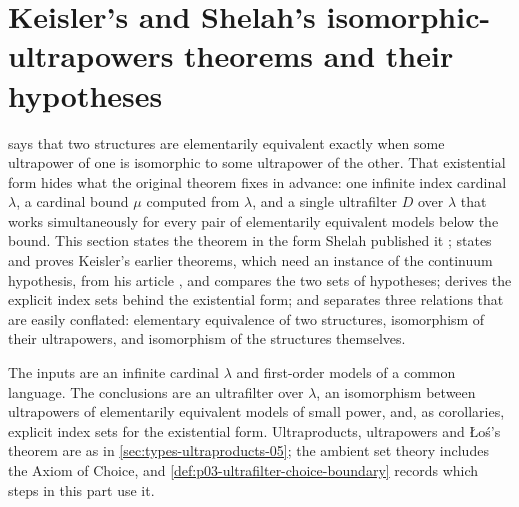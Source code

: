 \section{Keisler's and Shelah's isomorphic-ultrapowers theorems and their hypotheses}
\label{sec:p03-w03-p03-018-shelah-ultrapowers}

 says that two structures are elementarily
equivalent exactly when some ultrapower of one is isomorphic to some
ultrapower of the other.  That existential form hides what the original
theorem fixes in advance: one infinite index cardinal \(\lambda\), a cardinal
bound \(\mu\) computed from \(\lambda\), and a single ultrafilter \(D\) over
\(\lambda\) that works simultaneously for every pair of elementarily
equivalent models below the bound.  This section states the theorem in the
form Shelah published it \cite[224]{Shelah1971Ultrapowers}; states and proves
Keisler's earlier theorems, which need an instance of the continuum
hypothesis, from his article \cite{Keisler1961ElementaryClasses}, and
compares the two sets of hypotheses; derives the explicit index sets behind
the existential form; and separates three relations that are easily
conflated: elementary equivalence of two structures, isomorphism of their
ultrapowers, and isomorphism of the structures themselves.

The inputs are an infinite cardinal \(\lambda\) and first-order models of a
common language.  The conclusions are an ultrafilter over \(\lambda\), an
isomorphism between ultrapowers of elementarily equivalent models of small
power, and, as corollaries, explicit index sets for the existential form.
Ultraproducts, ultrapowers and \L o\'s's theorem are as in
\cref{sec:types-ultraproducts-05}; the ambient set theory includes the Axiom
of Choice, and \cref{def:p03-ultrafilter-choice-boundary} records which
steps in this part use it.

